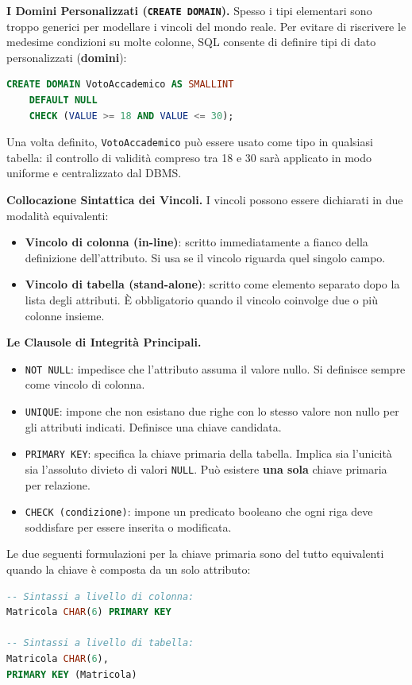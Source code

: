 \documentclass[12pt]{extarticle}
\begin{document}
\medskip
\noindent \textbf{I Domini Personalizzati (\texttt{CREATE DOMAIN}).} Spesso i tipi elementari sono troppo generici per modellare i vincoli del mondo reale. Per evitare di riscrivere le medesime condizioni su molte colonne, SQL consente di definire tipi di dato personalizzati (\textbf{domini}):
\begin{lstlisting}[language=SQL]
CREATE DOMAIN VotoAccademico AS SMALLINT
    DEFAULT NULL
    CHECK (VALUE >= 18 AND VALUE <= 30);
\end{lstlisting}
Una volta definito, \texttt{VotoAccademico} può essere usato come tipo in qualsiasi tabella: il controllo di validità compreso tra 18 e 30 sarà applicato in modo uniforme e centralizzato dal DBMS.

\noindent \textbf{Collocazione Sintattica dei Vincoli.} I vincoli possono essere dichiarati in due modalità equivalenti:
\begin{itemize}
    \item \textbf{Vincolo di colonna (in-line)}: scritto immediatamente a fianco della definizione dell'attributo. Si usa se il vincolo riguarda quel singolo campo.
    \item \textbf{Vincolo di tabella (stand-alone)}: scritto come elemento separato dopo la lista degli attributi. È obbligatorio quando il vincolo coinvolge due o più colonne insieme.
\end{itemize}

\medskip
\noindent \textbf{Le Clausole di Integrità Principali.}
\begin{itemize}
    \item \texttt{NOT NULL}: impedisce che l'attributo assuma il valore nullo. Si definisce sempre come vincolo di colonna.
    \item \texttt{UNIQUE}: impone che non esistano due righe con lo stesso valore non nullo per gli attributi indicati. Definisce una chiave candidata.
    \item \texttt{PRIMARY KEY}: specifica la chiave primaria della tabella. Implica sia l'unicità sia l'assoluto divieto di valori \texttt{NULL}. Può esistere \textbf{una sola} chiave primaria per relazione.
    \item \texttt{CHECK (condizione)}: impone un predicato booleano che ogni riga deve soddisfare per essere inserita o modificata.
\end{itemize}

\medskip
\noindent Le due seguenti formulazioni per la chiave primaria sono del tutto equivalenti quando la chiave è composta da un solo attributo:
\begin{lstlisting}[language=SQL]
-- Sintassi a livello di colonna:
Matricola CHAR(6) PRIMARY KEY

-- Sintassi a livello di tabella:
Matricola CHAR(6),
PRIMARY KEY (Matricola)
\end{lstlisting}
\end{document}

